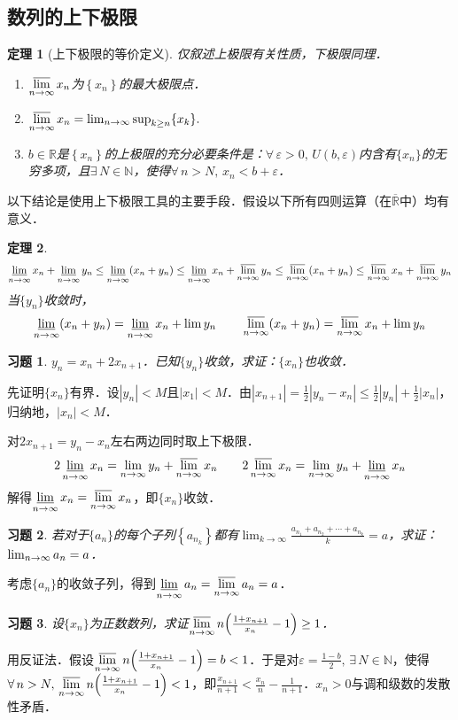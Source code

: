 \documentclass[11pt,a4paper]{ctexart}
\makeatletter
\theoremstyle{thmseries} %
\newtheorem{thm}{定理}[section]
\theoremstyle{exerseries}
\newtheorem{exer}{习题}[section]
\renewenvironment{proof}[1][\proofname]{\par
  \pushQED{\qed}%
  \normalfont \topsep6\p@\@plus6\p@\relax
  \trivlist
  \item[\hskip\labelsep
        \itshape
    #1\@addpunct{}]\ignorespaces
}{%
  \popQED\endtrivlist\@endpefalse
}
\newenvironment{pf}{\begin{proof}[\bfseries\upshape 证\quad]}{\end{proof}}
\newcommand{\bra}[1]{\mathopen{}\left(#1\right)}
\newcommand{\cbra}[1]{\mathopen{}\left\{#1\right\}}
\renewcommand{\epsilon}{\varepsilon}
\newcommand{\R}{\mathbb{R}}
\newcommand{\N}{\mathbb{N}}
\def \nti {\mathnormal{n}\to\infty}
\DeclareMathOperator{\llim}{\underset{\nti}{\underline{\lim}}}
\DeclareMathOperator{\ulim}{\underset{\nti}{\overline{\lim}}}
\makeatother
\begin{document}
\subsection{数列的上下极限}
\begin{thm}[上下极限的等价定义]
仅叙述上极限有关性质，下极限同理．
\begin{enumerate}
	\item $\ulim x_n$为$\cbra{x_n}$的最大极限点．
	\item $\ulim x_n=\lim_{n\to\infty}\sup_{k\geq n}\{x_k\}.$
	\item $b\in\R$是$\cbra{x_n}$的上极限的充分必要条件是：$\forall\,\epsilon>0,\,U\bra{b,\epsilon}$内含有$\{x_n\}$的无穷多项，且$\exists\,N\in\N$，使得$\forall\,n>N,\,x_n<b+\epsilon$．
\end{enumerate}
\end{thm}

以下结论是使用上下极限工具的主要手段．假设以下所有四则运算（在$\overline{\R}$中）均有意义．
\begin{thm}
	\[\llim x_n+\llim y_n\leq\llim\bra{x_n+y_n}\leq\llim x_n+\ulim y_n\leq\ulim\bra{x_n+y_n}\leq\ulim x_n+\ulim y_n\]
	当$\{y_n\}$收敛时，
	\[\llim\bra{x_n+y_n}=\llim x_n+\lim y_n\qquad\ulim\bra{x_n+y_n}=\ulim x_n+\lim y_n\]
\end{thm}

\begin{exer}
	$y_n=x_n+2x_{n+1}$．已知$\{y_n\}$收敛，求证：$\{x_n\}$也收敛．
\end{exer}
\begin{pf}
	先证明$\{x_n\}$有界．设$|y_n|<M$且$|x_1|<M$．由$|x_{n+1}|=\frac{1}{2}|y_n-x_n|\leq\frac{1}{2}|y_n|+\frac{1}{2}|x_n|$，归纳地，$|x_n|<M$．

	对$2x_{n+1}=y_n-x_n$左右两边同时取上下极限．
	\[2\llim x_n=\lim_{\nti}y_n+\ulim x_n\qquad2\ulim x_n=\lim_{\nti}y_n+\llim x_n\]
	解得$\llim x_n=\ulim x_n$，即$\{x_n\}$收敛．
\end{pf}

\begin{exer}
	若对于$\{a_n\}$的每个子列$\cbra{a_{n_k}}$都有$\lim_{k\to\infty}\frac{a_{n_1}+a_{n_2}+\cdots+a_{n_k}}{k}=a$，求证：$\lim_{\nti}a_n=a$．
\end{exer}
\begin{pf}
	考虑$\{a_n\}$的收敛子列，得到$\llim a_n=\ulim a_n=a$．
\end{pf}

\begin{exer}
	设$\{x_n\}$为正数数列，求证$\ulim n\bra{\frac{1+x_{n+1}}{x_n}-1}\geq1$．
\end{exer}
\begin{pf}
	用反证法．假设$\ulim n\bra{\frac{1+x_{n+1}}{x_n}-1}=b<1$．于是对$\epsilon=\frac{1-b}{2},\,\exists\,N\in\N$，使得$\forall\,n>N,\,\ulim n\bra{\frac{1+x_{n+1}}{x_n}-1}<1$，即$\frac{x_{n+1}}{n+1}<\frac{x_n}{n}-\frac{1}{n+1}$．$x_n>0$与调和级数的发散性矛盾．
\end{pf}
\end{document}
